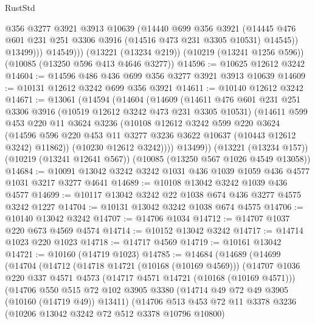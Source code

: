 \begin{lexlean}{RustStd}
\begin{coremodule}
                @356
                @3277
                @3921
                @3913
                @10639
                (@14440
                  @699
                  @356
                  @3921
                  (@14445 @476 @601 @231 @251 @3306 @3916 (@14516 @473 @231 @3305 @10531) @14545))
                @13499)))
          @14549)))
    (@13221 (@13234 @219))
    (@10219 (@13241 @1256 @596))
    (@10085 (@13250 @596 @413 @4646 @3277))
@14596 := @10625 @12612 @3242
@14604 := @14596 @486 @436 @699 @356 @3277 @3921 @3913 @10639
@14609 := @10131 @12612 @3242 @699 @356 @3921
@14611 := @10140 @12612 @3242
@14671 := @13061
    (@14594
      (@14604
        (@14609
          (@14611
            @476
            @601
            @231
            @251
            @3306
            @3916
            (@10519 @12612 @3242 @473 @231 @3305 @10531)
            (@14611
              @599
              @453
              @220
              @11
              @3624
              @3236
              (@10108
                @12612
                @3242
                @599
                @220
                @3624
                (@14596 @596 @220 @453 @11 @3277 @3236 @3622 @10637 (@10443 @12612 @3242) @11862))
              (@10230 @12612 @3242))))
        @13499))
    (@13221 (@13234 @157))
    (@10219 (@13241 @12641 @567))
    (@10085 (@13250 @567 @1026 @4549 @13058))
@14684 := @10091 @13042 @3242 @3242 @1031 @436 @1039 @1059 @436 @4577 @1031 @3217 @3277 @4641
@14689 := @10108 @13042 @3242 @1039 @436 @4577
@14699 := @10117 @13042 @3242 @22 @1038 @674 @436 @3277 @4575 @3242 @1227
@14704 := @10131 @13042 @3242 @1038 @674 @4575
@14706 := @10140 @13042 @3242
@14707 := @14706 @1034
@14712 := @14707 @1037 @220 @673 @4569 @4574
@14714 := @10152 @13042 @3242
@14717 := @14714 @1023 @220 @1023
@14718 := @14717 @4569
@14719 := @10161 @13042
@14721 := @10160 (@14719 @1023)
@14785 := @14684
    (@14689
      (@14699
        (@14704
          (@14712
            (@14718 @14721 (@10168 (@10169 @4569)))
            (@14707
              @1036
              @220
              @337
              @4571
              @4573
              (@14717 @4571 @14721 (@10168 (@10169 @4571)))
              (@14706
                @550
                @515
                @72
                @102
                @3905
                @3380
                (@14714 @49 @72 @49 @3905 (@10160 (@14719 @49)) @13411)
                (@14706
                  @513
                  @453
                  @72
                  @11
                  @3378
                  @3236
                  (@10206 @13042 @3242 @72 @512 @3378 @10796 @10800)

\end{coremodule}
\end{lexlean}
